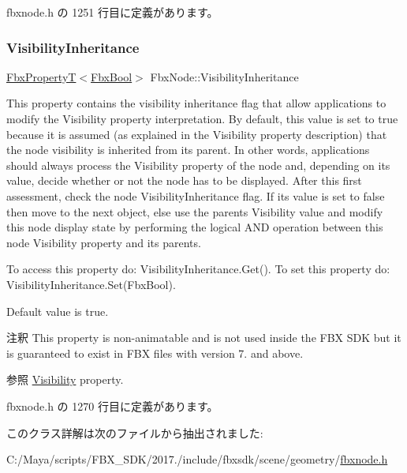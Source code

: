  fbxnode.\+h の 1251 行目に定義があります。

\mbox{\label{class_fbx_node_a30e99c3f4d79c72bca148ea4b250f6db}} 
\subsubsection{\texorpdfstring{Visibility\+Inheritance}{VisibilityInheritance}}
{\footnotesize\ttfamily \hyperlink{class_fbx_property_t}{Fbx\+PropertyT}$<$\hyperlink{fbxtypes_8h_a92e0562b2fe33e76a242f498b362262e}{Fbx\+Bool}$>$ Fbx\+Node\+::\+Visibility\+Inheritance}

This property contains the visibility inheritance flag that allow applications to modify the Visibility property interpretation. By default, this value is set to {\ttfamily true} because it is assumed (as explained in the Visibility property description) that the node visibility is inherited from its parent. In other words, applications should always process the Visibility property of the node and, depending on its value, decide whether or not the node has to be displayed. After this first assessment, check the node Visibility\+Inheritance flag. If its value is set to {\ttfamily false} then move to the next object, else use the parent\textquotesingle{}s Visibility value and modify this node display state by performing the logical A\+ND operation between this node Visibility property and its parent\textquotesingle{}s.

To access this property do\+: Visibility\+Inheritance.\+Get(). To set this property do\+: Visibility\+Inheritance.\+Set(\+Fbx\+Bool).

Default value is {\ttfamily true}. \begin{DoxyRemark}{注釈}
This property is non-\/animatable and is not used inside the F\+BX S\+DK but it is guaranteed to exist in F\+BX files with version 7. and above. 
\end{DoxyRemark}
\begin{DoxySeeAlso}{参照}
\hyperlink{class_fbx_node_a9f02f0a70b81c1a656137def3e34edb7}{Visibility} property. 
\end{DoxySeeAlso}


 fbxnode.\+h の 1270 行目に定義があります。



このクラス詳解は次のファイルから抽出されました\+:\begin{DoxyCompactItemize}
\item 
C\+:/\+Maya/scripts/\+F\+B\+X\+\_\+\+S\+D\+K/2017./include/fbxsdk/scene/geometry/\hyperlink{fbxnode_8h}{fbxnode.\+h}\end{DoxyCompactItemize}
